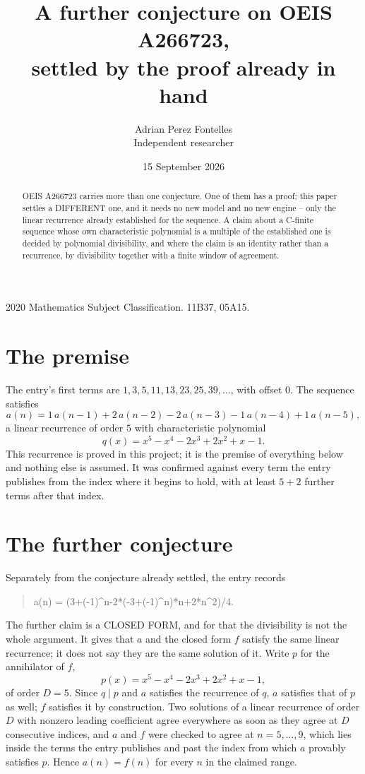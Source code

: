 \documentclass[11pt,a4paper]{article}
\title{A further conjecture on OEIS A266723,\\ \large settled by the proof already in hand}
\author{Adrian Perez Fontelles\\ \small Independent researcher}
\date{15 September 2026}
\theoremstyle{plain}
\theoremstyle{definition}
\begin{document}
\maketitle

\begin{abstract}
OEIS A266723 carries more than one conjecture. One of them has a proof; this paper settles a
DIFFERENT one, and it needs no new model and no new engine -- only the linear recurrence already
established for the sequence. A claim about a C-finite sequence whose own characteristic
polynomial is a multiple of the established one is decided by polynomial divisibility, and where
the claim is an identity rather than a recurrence, by divisibility together with a finite window
of agreement.
\end{abstract}

\noindent\small 2020 Mathematics Subject Classification. 11B37, 05A15.\normalsize

\section{The premise}

The entry's first terms are $1, 3, 5, 11, 13, 23, 25, 39,\dots$, with offset $0$. The sequence satisfies
\[
  a(n)=1\,a(n-1) + 2\,a(n-2) - 2\,a(n-3) - 1\,a(n-4) + 1\,a(n-5) ,
\]
a linear recurrence of order $5$ with characteristic polynomial
\[
  q(x)=x^{5} - x^{4} - 2 x^{3} + 2 x^{2} + x - 1 .
\]
This recurrence is proved in this project; it is the premise of everything below and nothing else is assumed.
It was confirmed against every term the entry publishes from the index where it begins to hold,
with at least $5+2$ further terms after that index.

\section{The further conjecture}

Separately from the conjecture already settled, the entry records

\begin{quote}\raggedright a(n) = (3+(-1)\^{}n-2*(-3+(-1)\^{}n)*n+2*n\^{}2)/4.\end{quote}

The further claim is a CLOSED FORM, and for that the divisibility is not the whole argument. It
gives that $a$ and the closed form $f$ satisfy the same linear recurrence; it does not say they
are the same solution of it. Write $p$ for the annihilator of $f$,
\[
  p(x)=x^{5} - x^{4} - 2 x^{3} + 2 x^{2} + x - 1 ,
\]
of order $D=5$. Since $q\mid p$ and $a$ satisfies the recurrence of $q$, $a$ satisfies that of
$p$ as well; $f$ satisfies it by construction. Two solutions of a linear recurrence of order $D$
with nonzero leading coefficient agree everywhere as soon as they agree at $D$ consecutive
indices, and $a$ and $f$ were checked to agree at $n=5,\dots,9$,
which lies inside the terms the entry publishes and past the index from which $a$ provably
satisfies $p$. Hence $a(n)=f(n)$ for every $n$ in the claimed range.
\end{document}
